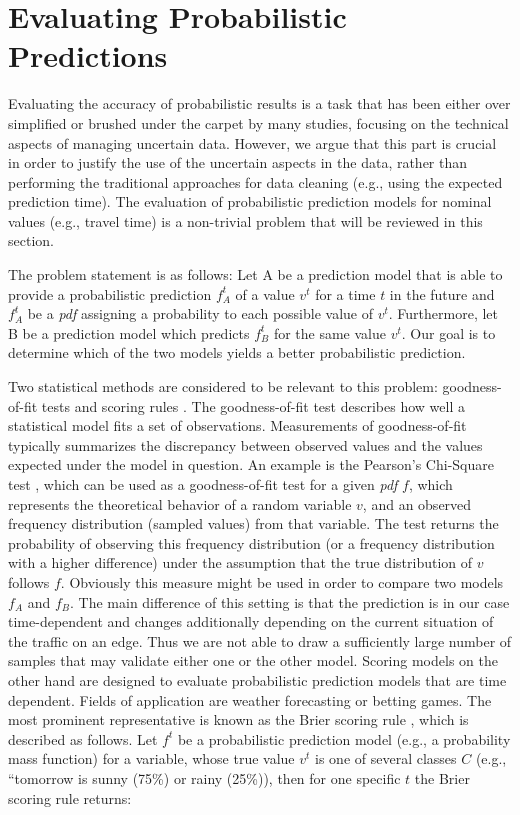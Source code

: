 \section{Evaluating Probabilistic Predictions}
\vspace{0.2cm}
\label{sec:evaluate}
Evaluating the accuracy of probabilistic results is a task that has been either
over simplified or brushed under the carpet by many studies, focusing on the
technical aspects of managing uncertain data. However, we argue that this part
is crucial in order to justify the use of the uncertain aspects in the data,
rather than performing the traditional approaches for data cleaning (e.g., using the expected prediction
time). The evaluation of probabilistic prediction models for nominal values
(e.g., travel time) is a non-trivial problem that will be reviewed in this
section.

The problem statement is as follows: Let A be a prediction model that is able
to provide a probabilistic prediction $f_A^t$ of a value $v^t$ for a
time $t$ in the future and $f_A^t$ be a \textit{pdf} assigning a probability to
each possible value of $v^t$. Furthermore, let B be a prediction model which predicts
$f_B^t$ for the same value $v^t$. Our goal is to determine which of the two
models yields a better probabilistic prediction.

Two statistical methods are considered to be relevant to this problem:
goodness-of-fit tests \cite{Taylor97} and scoring rules \cite{Bickel07}. The
goodness-of-fit test describes how well a statistical model fits a set of
observations.
Measurements of goodness-of-fit typically summarizes the discrepancy between
observed values and the values expected under the model in question. An example is the
Pearson's Chi-Square test \cite{Pearson00}, which can be used as a goodness-of-fit
test for a given \textit{pdf} $f$, which represents the theoretical behavior of
a random variable $v$, and an observed frequency distribution (sampled values)
from that variable. The test returns the probability of observing this frequency
distribution (or a frequency distribution with a higher difference) under the
assumption that the true distribution of $v$ follows $f$. Obviously this measure
might be used in order to compare two models $f_A$ and $f_B$. The main
difference of this setting is that the prediction is in our case time-dependent
and changes additionally depending on the current situation of the traffic on
an edge. Thus we are not able to draw a sufficiently large number of samples
that may validate either one or the other model.
Scoring models on the other hand are designed to evaluate probabilistic
prediction models that are time dependent. Fields of application are weather
forecasting or betting games. The most prominent representative is known as the
Brier scoring rule \cite{Brier50}, which is described as follows. Let $f^t$ be a
probabilistic prediction model (e.g., a probability mass function) for a
variable, whose true value $v^t$ is one of several classes $C$ (e.g., ``tomorrow
is sunny (75\%) or rainy (25\%)), then for one specific $t$ the Brier scoring
rule returns:

